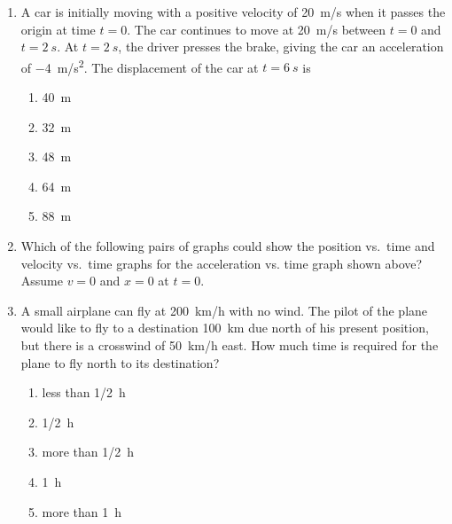 \documentclass{../../oss-apphys}
\begin{document}
\begin{multicols}{2}
\begin{enumerate}[resume,leftmargin=18pt]
  \item A car is initially moving with a positive velocity of \SI{20}{m/s} when
    it passes the origin at time $t=0$. The car continues to move at
    \SI{20}{m/s} between $t=0$ and $t=\SI{2}{s}$. At $t=\SI{2}{s}$, the driver
    presses the brake, giving the car an acceleration of \SI{-4}{m/s^2}. The
    displacement of the car at $t=\SI{6}{s}$ is
    \begin{enumerate}[noitemsep,topsep=0pt,leftmargin=18pt,label=(\Alph*)]
    \item\SI{40}{\metre}
    \item\SI{32}{\metre}
    \item\SI{48}{\metre}
    \item\SI{64}{\metre}
    \item\SI{88}{\metre}
    \end{enumerate}

  \item Which of the following pairs of graphs could show the position vs.\
    time and velocity vs.\ time graphs for the acceleration vs. time graph
    shown above? Assume $v=0$ and $x=0$ at $t=0$.
    \begin{center}
    \end{center}
    \columnbreak
    
  \item A small airplane can fly at \SI{200}{km/h} with no wind. The pilot of
    the plane would like to fly to a destination \SI{100}{km} due north of his
    present position, but there is a crosswind of \SI{50}{km/h} east. How much
    time is required for the plane to fly north to its destination?
    \begin{enumerate}[noitemsep,topsep=0pt,leftmargin=18pt,label=(\Alph*)]
    \item less than \SI{1/2}{\hour}
    \item \SI{1/2}{\hour}
    \item more than \SI{1/2}{\hour}
    \item \SI{1}{\hour}
    \item more than \SI{1}{\hour}
    \end{enumerate}
  

\end{enumerate}
\end{multicols}
\end{document}
